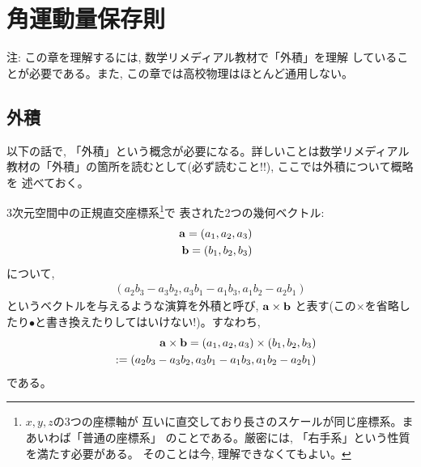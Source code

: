 \chapter{角運動量保存則}

注: この章を理解するには, 数学リメディアル教材で「外積」を理解
していることが必要である。また, この章では高校物理はほとんど通用しない。\mv


\section{外積}

以下の話で, 「外積」という概念が必要になる。詳しいことは数学リメディアル
教材の「外積」の箇所を読むとして(必ず読むこと!!), ここでは外積について概略を
述べておく。

3次元空間中の正規直交座標系\footnote{$x, y, z$の3つの座標軸が
互いに直交しており長さのスケールが同じ座標系。まあいわば「普通の座標系」
のことである。厳密には, 「右手系」という性質を満たす必要がある。
そのことは今, 理解できなくてもよい。}で
表された2つの幾何ベクトル:
\begin{eqnarray}
&&{\bf a}=(a_1, a_2, a_3)\\
&&{\bf b}=(b_1, b_2, b_3)
\end{eqnarray}
について, 
\begin{eqnarray}
(a_2b_3-a_3b_2, a_3b_1-a_1b_3, a_1b_2-a_2b_1)
\end{eqnarray}
というベクトルを与えるような演算を外積と呼び, ${\bf a}\times{\bf b}$
と表す(この$\times$を省略したり$\bullet$と書き換えたりしてはいけない!)。すなわち, 
\begin{eqnarray}
&&{\bf a}\times{\bf b}=(a_1, a_2, a_3)\times(b_1, b_2, b_3)\nonumber\\
&&:=(a_2b_3-a_3b_2, a_3b_1-a_1b_3, a_1b_2-a_2b_1)
\label{eq:vectprod}\end{eqnarray}
である。

